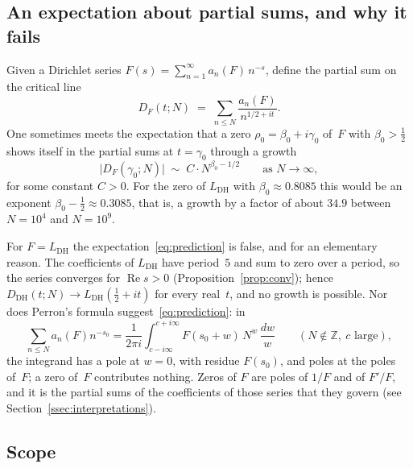 \documentclass[11pt]{amsart}
\theoremstyle{definition}
\theoremstyle{remark}
\newcommand{\Z}{\mathbb{Z}}
\renewcommand{\DH}{\mathrm{DH}}
\newcommand{\abs}[1]{\lvert #1 \rvert}
\newcommand{\re}{\operatorname{Re}}
\begin{document}
\subsection{An expectation about partial sums, and why it fails}

Given a Dirichlet series $F(s) = \sum_{n=1}^{\infty} a_n(F)\, n^{-s}$,
define the partial sum on the critical line
\begin{equation}\label{eq:partial-sum}
  D_F(t; N) \;=\; \sum_{n \le N} \frac{a_n(F)}{n^{1/2 + it}}.
\end{equation}
One sometimes meets the expectation that a zero
$\rho_0 = \beta_0 + i\gamma_0$ of~$F$ with $\beta_0 > \tfrac{1}{2}$ shows
itself in the partial sums at $t = \gamma_0$ through a growth
\begin{equation}\label{eq:prediction}
  \abs{D_F(\gamma_0; N)} \;\sim\; C \cdot N^{\beta_0 - 1/2}
  \qquad \text{as } N \to \infty,
\end{equation}
for some constant $C > 0$.  For the zero of $L_{\DH}$ with
$\beta_0 \approx 0.8085$ this would be an exponent
$\beta_0 - \tfrac{1}{2} \approx 0.3085$, that is, a growth by a factor of
about $34.9$ between $N = 10^4$ and $N = 10^9$.

For $F=L_{\DH}$ the expectation~\eqref{eq:prediction} is false, and for an
elementary reason.  The coefficients of $L_{\DH}$ have period~$5$ and sum
to zero over a period, so the series converges for $\re s>0$
(Proposition~\ref{prop:conv}); hence
$D_{\DH}(t;N)\to L_{\DH}(\tfrac12+it)$ for every real~$t$, and no growth
is possible.  Nor does Perron's formula suggest~\eqref{eq:prediction}: in
\[
  \sum_{n\le N}a_n(F)n^{-s_0}
  =\frac1{2\pi i}\int_{c-i\infty}^{c+i\infty}F(s_0+w)\,N^{w}\,\frac{dw}{w}
  \qquad(N\notin\Z,\ c \text{ large}),
\]
the integrand has a pole at $w=0$, with residue $F(s_0)$, and poles at the
poles of~$F$; a zero of~$F$ contributes nothing.  Zeros of $F$ are poles
of $1/F$ and of $F'/F$, and it is the partial sums of the coefficients of
those series that they govern (see Section~\ref{ssec:interpretations}).

\subsection{Scope}
\end{document}

